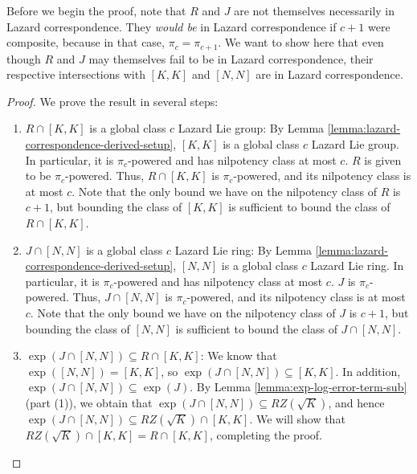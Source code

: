Before we begin the proof, note that $R$ and $J$ are not themselves
necessarily in Lazard correspondence. They {\em would be} in Lazard
correspondence if $c + 1$ were composite, because in that case, $\pi_c
= \pi_{c+1}$. We want to show here that even though $R$ and $J$ may
themselves fail to be in Lazard correspondence, their respective
intersections with $[K,K]$ and $[N,N]$ are in Lazard correspondence.

\begin{proof}
  We prove the result in several steps:

  \begin{enumerate}
  \item $R \cap [K,K]$ is a global class $c$ Lazard Lie group: By
    Lemma \ref{lemma:lazard-correspondence-derived-setup}, $[K,K]$ is
    a global class $c$ Lazard Lie group. In particular, it is
    $\pi_c$-powered and has nilpotency class at most $c$. $R$ is given
    to be $\pi_c$-powered. Thus, $R \cap [K,K]$ is $\pi_c$-powered,
    and its nilpotency class is at most $c$. Note that the only bound
    we have on the nilpotency class of $R$ is $c + 1$, but bounding the
    class of $[K,K]$ is sufficient to bound the class of $R \cap
    [K,K]$.
  \item $J \cap [N,N]$ is a global class $c$ Lazard Lie ring: By Lemma
    \ref{lemma:lazard-correspondence-derived-setup}, $[N,N]$ is a
    global class $c$ Lazard Lie ring. In particular, it is
    $\pi_c$-powered and has nilpotency class at most $c$. $J$ is
    $\pi_c$-powered. Thus, $J \cap [N,N]$ is $\pi_c$-powered, and its
    nilpotency class is at most $c$. Note that the only bound we have
    on the nilpotency class of $J$ is $c + 1$, but bounding the class
    of $[N,N]$ is sufficient to bound the class of $J \cap [N,N]$.
  \item $\exp(J \cap [N,N]) \subseteq R \cap [K,K]$: We know that
    $\exp([N,N]) = [K,K]$, so $\exp(J \cap [N,N]) \subseteq [K,K]$. In
    addition, $\exp(J \cap [N,N]) \subseteq \exp(J)$. By Lemma
    \ref{lemma:exp-log-error-term-sub} (part (1)), we obtain that
    $\exp(J \cap [N,N]) \subseteq RZ(\sqrt{K})$, and hence $\exp(J
    \cap [N,N]) \subseteq RZ(\sqrt{K}) \cap [K,K]$. We will show that
    $RZ(\sqrt{K}) \cap [K,K] = R \cap [K,K]$, completing the proof.


\end{enumerate}
\end{proof}
